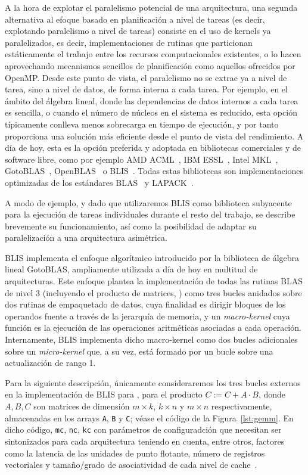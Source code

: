 A la hora de explotar el paralelismo potencial de una arquitectura, una segunda alternativa al efoque 
basado en planificación a nivel de tareas (es decir, explotando paralelismo
a nivel de tareas) consiste en el uso de kernels ya paralelizados, es decir, implementaciones
de rutinas que particionan estáticamente el trabajo entre los recursos computacionales existentes, o 
lo hacen aprovechando mecanismos sencillos de planificación como aquellos ofrecidos por OpenMP. Desde
este punto de vista, el paralelismo no se extrae ya a nivel de tarea, sino a nivel de datos, de forma
interna a cada tarea. Por ejemplo, en el ámbito del álgebra lineal, donde las dependencias de datos
internos a cada tarea es sencilla, o cuando el número de núcleos en el sistema es reducido, esta 
opción típicamente conlleva menos sobrecarga en tiempo de ejecución, y por tanto proporciona
una solución más eficiente desde el punto de vista del rendimiento. A día de hoy, esta es la
opción preferida y adoptada en bibliotecas comerciales y de software libre, como por ejemplo
AMD ACML~\cite{ACML}, IBM ESSL~\cite{ESSL}, Intel MKL~\cite{mkl}, GotoBLAS~\cite{Goto:2008:AHP}, OpenBLAS~\cite{OpenBLAS} o BLIS~\cite{BLIS1}. Todas estas bibliotecas son implementaciones
optimizadas de los estándares BLAS~\cite{blas1,blas2,blas3} y LAPACK~\cite{lapack}.

A modo de ejemplo, y dado que utilizaremos BLIS como biblioteca subyacente para la ejecución de tareas
individuales durante el resto del trabajo, se describe brevemente su funcionamiento, así como la posibilidad
de adaptar su paralelización a una arquitectura asimétrica.

BLIS implementa el enfoque algorítmico introducido por la biblioteca de álgebra lineal GotoBLAS, ampliamente
utilizada a día de hoy en multitud de arquitecturas. Este enfoque plantea la implementación de todas las rutinas
BLAS de nivel 3 (incluyendo el producto de matrices, \gemm) como tres bucles anidados sobre dos rutinas de 
empaquetado de datos, cuya finalidad es dirigir bloques de los operandos fuente a través de la jerarquía
de memoria, y un {\em macro-kernel} cuya función es la ejecución de las operaciones aritméticas asociadas
a cada operación. Internamente, BLIS implementa dicho macro-kernel como dos bucles adicionales sobre un 
{\em micro-kernel} que, a su vez, está formado por un bucle sobre una actualización de rango 1.

Para la siguiente descripción, únicamente consideraremos los tres bucles externos en la implementación de 
BLIS para \gemm, para el producto $C:=C+A\cdot B$, donde $A,B,C$ son matrices de dimensión $m \times k$, $k\times n$ 
y $m \times n$ respectivamente, almacenadas en los arrays {\tt A}, {\tt B} y {\tt C}; véase el código de la Figura~\ref{lst:gemm}.
En dicho código, {\tt mc}, {\tt nc}, {\tt kc} con parámetros de configuradción que necesitan ser sintonizados para cada
arquitectura teniendo en cuenta, entre otros, factores como la latencia de las unidades de punto flotante, número
de registros vectoriales y tamaño/grado de asociatividad de cada nivel de cache~\cite{BLIS4}.

